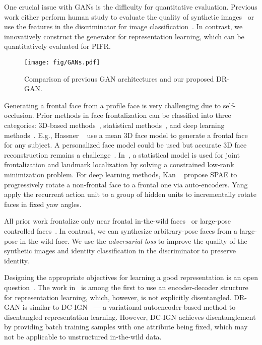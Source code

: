 \documentclass[10pt,journal,compsoc]{IEEEtran}
\begin{document}
One crucial issue with GANs is the difficulty for quantitative evaluation. 
Previous work either perform human study to evaluate the quality of synthetic images~\cite{denton2015deep} or use the features in the discriminator for image classification~\cite{radford2015unsupervised}.
In contrast, we innovatively construct the generator for representation learning, which can be quantitatively evaluated for PIFR.

\begin{figure*}[t!]
\centering
\texttt{[image: fig/GANs.pdf]}
\caption{\small Comparison of previous GAN architectures and our proposed DR-GAN.}
\label{fig:gans}
\figvspace
\end{figure*}
Generating a frontal face from a profile face is very challenging due to self-occlusion. 
Prior methods in face frontalization can be classified into three categories: $3$D-based methods~\cite{zhu2015high, hassner2015effective,li2012morphable}, statistical methods~\cite{sagonas2015robust}, and deep learning methods~\cite{zhu2014multi, yang2015weakly, yim2015rotating,kan2014stacked,zhang2013random}. 
E.g., Hassner \etal~\cite{hassner2015effective} use a mean $3$D face model to generate a frontal face for any subject.
A personalized face model could be used but accurate $3$D face reconstruction remains a challenge~\cite{roth2017pami,joint-face-alignment-and-3d-face-reconstruction,tran2018nonlinear,tran2018on}.
In~\cite{sagonas2015robust}, a statistical model is used for joint frontalization and landmark localization by solving a constrained low-rank minimization problem. 
For deep learning methods, Kan \etal~\cite{kan2014stacked} propose SPAE to progressively rotate a non-frontal face to a frontal one via auto-encoders.  
Yang \etal~\cite{yang2015weakly} apply the recurrent action unit to a group of hidden units to incrementally rotate faces in fixed yaw angles. 

All prior work frontalize only near frontal in-the-wild faces~\cite{hassner2015effective,zhu2015high} or large-pose controlled faces~\cite{yim2015rotating,zhu2014multi}.
In contrast, we can synthesize arbitrary-pose faces from a large-pose in-the-wild face. 
We use the {\it adversarial loss} to improve the quality of the synthetic images and identity classification in the discriminator to preserve identity. 

Designing the appropriate objectives for learning a good representation is an open question~\cite{bengio2013representation}.
The work in~\cite{huang2007unsupervised} is among the first to use an encoder-decoder structure for representation learning, which, however, is not explicitly disentangled. 
DR-GAN is similar to DC-IGN~\cite{kulkarni2015deep} --- a variational autoencoder-based method to disentangled representation learning. 
However, DC-IGN achieves disentanglement by providing batch training samples with one attribute being fixed, which may not be applicable to unstructured in-the-wild data. 
\end{document}
